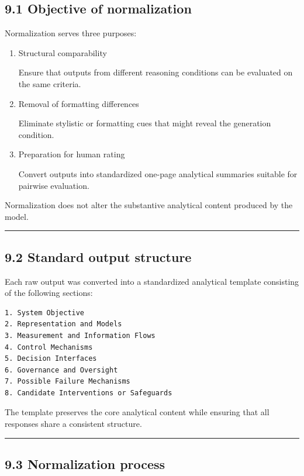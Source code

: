 {\subsection*{9.1 Objective of normalization}

Normalization serves three purposes:

\begin{enumerate}
\item Structural comparability

Ensure that outputs from different reasoning conditions can be evaluated on the same criteria.

\item Removal of formatting differences

Eliminate stylistic or formatting cues that might reveal the generation condition.

\item Preparation for human rating

Convert outputs into standardized one-page analytical summaries suitable for pairwise evaluation.
\end{enumerate}

Normalization does not alter the substantive analytical content produced by the model.

\noindent\rule{\textwidth}{0.4pt}

\subsection*{9.2 Standard output structure}

Each raw output was converted into a standardized analytical template consisting of the following sections:

\begin{verbatim}
1. System Objective
2. Representation and Models
3. Measurement and Information Flows
4. Control Mechanisms
5. Decision Interfaces
6. Governance and Oversight
7. Possible Failure Mechanisms
8. Candidate Interventions or Safeguards
\end{verbatim}

The template preserves the core analytical content while ensuring that all responses share a consistent structure.

\noindent\rule{\textwidth}{0.4pt}

\subsection*{9.3 Normalization process}

}
